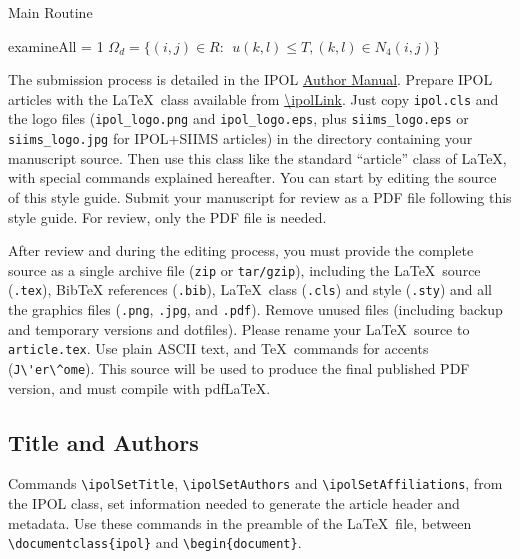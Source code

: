 \documentclass{ipol}
\begin{document}
\begin{algorithm}[!htbp]
\caption{Main Routine}
\DontPrintSemicolon
{}
\Output{$\mathbf{\alpha}$}
examineAll = 1
$\Omega_d=\{(i, j)\in R: \ \ u(k,l) \leq T, (k,l) \in N_4(i,j)\}$
\label{alg:example}
\end{algorithm}





The submission process is detailed in the IPOL
\href{https://tools.ipol.im/wiki/ref/author\_manual/}{Author Manual}. 
Prepare IPOL articles with the \LaTeX\ class available from
\url{\ipolLink}. Just copy \verb|ipol.cls| and the logo
files (\verb|ipol_logo.png| and \verb|ipol_logo.eps|, plus
\verb|siims_logo.eps| or \verb|siims_logo.jpg| for IPOL+SIIMS
articles) in the directory containing your manuscript source. Then use
this class like the standard ``article'' class of \LaTeX, with special
commands explained hereafter. You can start by editing the source of
this style guide. Submit your manuscript for review as a PDF file
following this style guide. For review, only the PDF file is needed.

After review and during the editing process, you must provide the
complete source as a single archive file (\verb|zip| or
\verb|tar/gzip|), including the \LaTeX\ source (\verb|.tex|), BibTeX
references (\verb|.bib|), \LaTeX\ class (\verb|.cls|) and style
(\verb|.sty|) and all the graphics files (\verb|.png|, \verb|.jpg|,
and \verb|.pdf|). Remove unused files (including backup and temporary
versions and dotfiles). Please rename your \LaTeX\ source to
\verb|article.tex|. Use plain ASCII text, and \TeX\ commands for
accents (\verb|J\'er\^ome|). This source will be used to produce the
final published PDF version, and must compile with pdf\LaTeX.

\subsection{Title and Authors}

Commands \verb|\ipolSetTitle|, \verb|\ipolSetAuthors| and
\verb|\ipolSetAffiliations|, from the IPOL class, set information
needed to generate the article header and metadata. Use these commands
in the preamble of the \LaTeX\ file, between
\verb|\documentclass{ipol}| and \verb|\begin{document}|.
\end{document}
